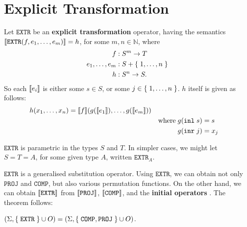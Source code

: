 \section{Explicit Transformation}

\label{sec:explicit-transformation}

\begin{definition} \cite[p. 21]{smullyan-1961} Let $\mathtt{EXTR}$ be an
\textbf{explicit transformation} operator, having the semantics
${\mathopen{}\left\llbracket{\mathtt{EXTR}{\ensuremath{\mathopen{}\left({f,e_1,\ldots,e_m}\right)\mathclose{}}}}\right\rrbracket\mathclose{}} = h$, for some $m,n \in \mathbb{N}$,
where\begin{align*}
%
f & : S^m \rightarrow T \\
%
e_1, \ldots, e_m & : S + \set{1,\ldots,n} \\
%
h & : S^n \rightarrow S.
%
\end{align*} So each ${\mathopen{}\left\llbracket{e_i}\right\rrbracket\mathclose{}}$ is either some $s \in S$, or some $j \in
\mathopen{}\left\{\mathrel{}{1,\ldots, n}\mathrel{}\right\}\mathclose{}$. $h$ itself is given as follows:\begin{alignat*}{3}
%
h\p{x_1,\ldots,x_n} &= \sem{f}\p{g\p{\sem{e_1}},\ldots,g\p{\sem{e_m}}} \\
%
& & \text{where} \; g\p{\mathtt{inl} \; s} &= s \\
%
& & g\p{\mathtt{inr} \; j} &= x_j
%
\end{alignat*}

\end{definition}

\begin{remark} $\mathtt{EXTR}$ is parametric in the types $S$ and $T$. In
simpler cases, we might let $S=T=A$, for some given type $A$, written
$\mathtt{EXTR}_A$. \end{remark}

$\mathtt{EXTR}$ is a generalised substitution operator. Using $\mathtt{EXTR}$,
we can obtain not only $\mathtt{PROJ}$ and $\mathtt{COMP}$, but also various
permutation functions.  On the other hand, we can obtain ${\mathopen{}\left\llbracket{\mathtt{EXTR}}\right\rrbracket\mathclose{}}$
from ${\mathopen{}\left\llbracket{\mathtt{PROJ}}\right\rrbracket\mathclose{}}$, ${\mathopen{}\left\llbracket{\mathtt{COMP}}\right\rrbracket\mathclose{}}$, and the {\bfseries
\color{red} initial operators} \cite{rose-1984}. The theorem follows:


\begin{theorem}\label{thm:extr-comp-proj} ${\mathopen{}\left({\Sigma,\mathopen{}\left\{\mathrel{}{\mathtt{EXTR}}\mathrel{}\right\}\mathclose{} \cup
O}\right)\mathclose{}} = {\mathopen{}\left({\Sigma,\mathopen{}\left\{\mathrel{}{\mathtt{COMP}, \mathtt{PROJ}}\mathrel{}\right\}\mathclose{} \cup O}\right)\mathclose{}}$. \end{theorem}

